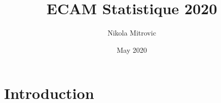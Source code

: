 \documentclass{article}
\title{ECAM Statistique 2020}
\author{Nikola Mitrovic}
\date{May 2020}
\begin{document}
\maketitle

\section{Introduction}
\end{document}
